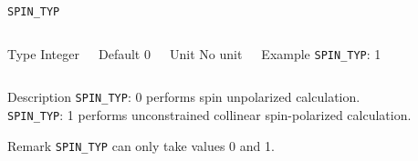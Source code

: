 \documentclass[xcolor=dvipsnames,t]{beamer}
\begin{document}
\begin{frame}[allowframebreaks]{\texttt{SPIN\_TYP}} \label{SPIN_TYP}
\vspace*{-12pt}
\begin{columns}
\begin{block}{Type}
Integer
\end{block}

\begin{block}{Default}
0
\end{block}

\begin{block}{Unit}
No unit
\end{block}

\begin{block}{Example}
\texttt{SPIN\_TYP}: 1
\end{block}
\end{columns}

\begin{block}{Description}
\texttt{SPIN\_TYP}: 0 performs spin unpolarized calculation. \\
\texttt{SPIN\_TYP}: 1 performs unconstrained collinear spin-polarized calculation.   
\end{block}

\begin{block}{Remark}
\texttt{SPIN\_TYP} can only take values 0 and 1.
\end{block}

\end{frame}
\end{document}
